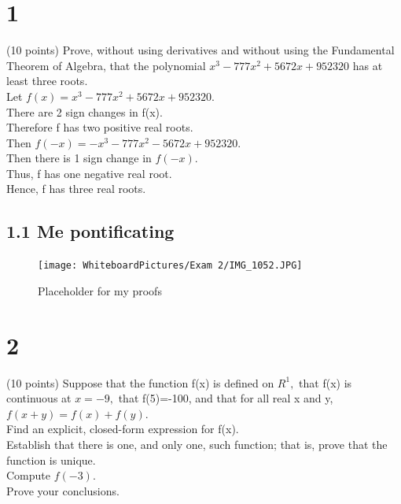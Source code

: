 \section*{1}
(10 points) Prove, without using derivatives and without using the Fundamental Theorem of Algebra, that the polynomial $x^3-777x^2+5672x+952320$ has at least three roots. 
\\
Let $f(x)=x^3-777x^2+5672x+952320.$ \\ 
There are 2 sign changes in f(x). \\ 
Therefore f has two positive real roots. \\ 
Then $f(-x)=-x^3-777x^2-5672x+952320.$\\ 
Then there is 1 sign change in $f(-x).$ \\ 
Thus, f has one negative real root. \\ 
Hence, f has three real roots. 
\subsection*{1.1 Me pontificating}


\begin{figure}[h]\begin{center}\texttt{[image: WhiteboardPictures/Exam 2/IMG\_1052.JPG]}
\caption{Placeholder for my proofs} \label{fig:Euler_pic}\end{center}\end{figure} 

\newpage


\section*{2}
(10 points) Suppose that the function f(x) is defined on $R^1,$ that f(x) is continuous at $x=-9,$ that f(5)=-100, and that for all real x and y, $f(x+y)=f(x)+f(y).$ \\ 
Find an explicit, closed-form expression for f(x). \\ 
Establish that there is one, and only one, such function; that is, prove that the function is unique. \\ 
Compute $f(-3).$ \\ 
Prove your conclusions. \\ 



